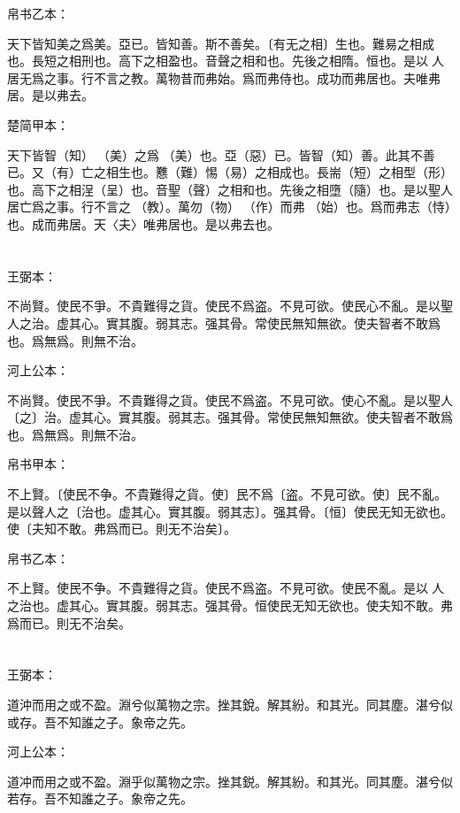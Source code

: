 \documentclass[a5paper]{ctexbook}
\begin{document}
    帛书乙本：

    天下皆知美之爲美。亞已。皆知善。斯不善矣。〔有无之相〕生也。難易之相成也。長短之相刑也。高下之相盈也。音聲之相和也。先後之相隋。恒也。是以𦔻人居无爲之事。行不言之教。萬物昔而弗始。爲而弗侍也。成功而弗居也。夫唯弗居。是以弗去。

    楚简甲本：

    天下皆智（知）𢼸（美）之爲󶴲（美）也。亞（惡）已。皆智（知）善。此其不善已。又（有）亡之相生也。戁（難）惕（易）之相成也。長耑（短）之相型（形）也。高下之相浧（呈）也。音聖（聲）之相和也。先後之相墮（隨）也。是以聖人居亡爲之事。行不言之𡥈（教）。萬勿（物）󶴳（作）而弗󶴢（始）也。爲而弗志（恃）也。成而弗居。天〈夫〉唯弗居也。是以弗去也。

    \chapter{}
    王弼本：

    不尚賢。使民不爭。不貴難得之貨。使民不爲盗。不見可欲。使民心不亂。是以聖人之治。虚其心。實其腹。弱其志。强其骨。常使民無知無欲。使夫智者不敢爲也。爲無爲。則無不治。

    河上公本：

    不尚賢。使民不爭。不貴難得之貨。使民不爲盗。不見可欲。使心不亂。是以聖人〔之〕治。虚其心。實其腹。弱其志。强其骨。常使民無知無欲。使夫智者不敢爲也。爲無爲。則無不治。

    帛书甲本：

    不上賢。〔使民不争。不貴難得之貨。使〕民不爲〔盗。不見可欲。使〕民不亂。是以聲人之〔治也。虚其心。實其腹。弱其志〕。强其骨。〔恒〕使民无知无欲也。使〔夫知不敢。弗爲而已。則无不治矣〕。

    帛书乙本：

    不上賢。使民不争。不貴難得之貨。使民不爲盗。不見可欲。使民不亂。是以𦔻人之治也。虚其心。實其腹。弱其志。强其骨。恒使民无知无欲也。使夫知不敢。弗爲而已。則无不治矣。

    \chapter{}
    王弼本：

    道沖而用之或不盈。淵兮似萬物之宗。挫其銳。解其紛。和其光。同其塵。湛兮似或存。吾不知誰之子。象帝之先。

    河上公本：

    道冲而用之或不盈。淵乎似萬物之宗。挫其鋭。解其紛。和其光。同其塵。湛兮似若存。吾不知誰之子。象帝之先。
\end{document}
